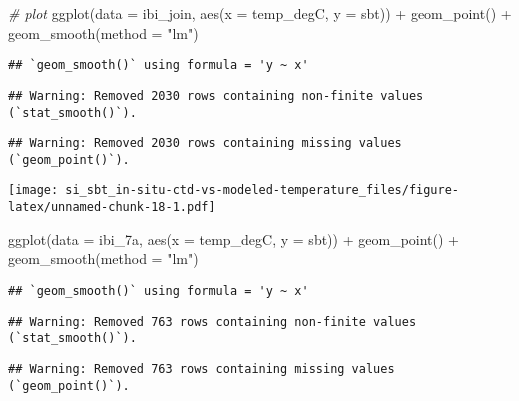 \documentclass[
]{article}
\newenvironment{Shaded}{\begin{snugshade}}{\end{snugshade}}
\newcommand{\AttributeTok}[1]{\textcolor[rgb]{0.77,0.63,0.00}{#1}}
\newcommand{\CommentTok}[1]{\textcolor[rgb]{0.56,0.35,0.01}{\textit{#1}}}
\newcommand{\FunctionTok}[1]{\textcolor[rgb]{0.00,0.00,0.00}{#1}}
\newcommand{\NormalTok}[1]{#1}
\newcommand{\SpecialCharTok}[1]{\textcolor[rgb]{0.00,0.00,0.00}{#1}}
\newcommand{\StringTok}[1]{\textcolor[rgb]{0.31,0.60,0.02}{#1}}
\begin{document}
\begin{Shaded}
\begin{Highlighting}[]
\CommentTok{\# plot}
\FunctionTok{ggplot}\NormalTok{(}\AttributeTok{data =}\NormalTok{ ibi\_join, }\FunctionTok{aes}\NormalTok{(}\AttributeTok{x =}\NormalTok{ temp\_degC, }\AttributeTok{y =}\NormalTok{ sbt)) }\SpecialCharTok{+} \FunctionTok{geom\_point}\NormalTok{() }\SpecialCharTok{+} \FunctionTok{geom\_smooth}\NormalTok{(}\AttributeTok{method =} \StringTok{"lm"}\NormalTok{)}
\end{Highlighting}
\end{Shaded}

\begin{verbatim}
## `geom_smooth()` using formula = 'y ~ x'
\end{verbatim}

\begin{verbatim}
## Warning: Removed 2030 rows containing non-finite values (`stat_smooth()`).
\end{verbatim}

\begin{verbatim}
## Warning: Removed 2030 rows containing missing values (`geom_point()`).
\end{verbatim}

\texttt{[image: si\_sbt\_in-situ-ctd-vs-modeled-temperature\_files/figure-latex/unnamed-chunk-18-1.pdf]}

\begin{Shaded}
\begin{Highlighting}[]
\FunctionTok{ggplot}\NormalTok{(}\AttributeTok{data =}\NormalTok{ ibi\_7a, }\FunctionTok{aes}\NormalTok{(}\AttributeTok{x =}\NormalTok{ temp\_degC, }\AttributeTok{y =}\NormalTok{ sbt)) }\SpecialCharTok{+} \FunctionTok{geom\_point}\NormalTok{() }\SpecialCharTok{+} \FunctionTok{geom\_smooth}\NormalTok{(}\AttributeTok{method =} \StringTok{"lm"}\NormalTok{)}
\end{Highlighting}
\end{Shaded}

\begin{verbatim}
## `geom_smooth()` using formula = 'y ~ x'
\end{verbatim}

\begin{verbatim}
## Warning: Removed 763 rows containing non-finite values (`stat_smooth()`).
\end{verbatim}

\begin{verbatim}
## Warning: Removed 763 rows containing missing values (`geom_point()`).
\end{verbatim}
\end{document}
